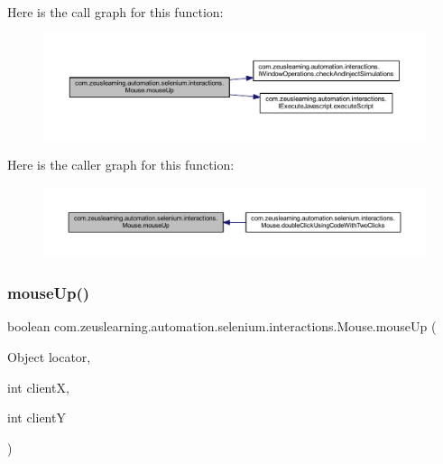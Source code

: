 Here is the call graph for this function\+:
\nopagebreak
\begin{figure}[H]
\begin{center}
\leavevmode
\includegraphics[width=350pt]{d0/dfa/classcom_1_1zeuslearning_1_1automation_1_1selenium_1_1interactions_1_1Mouse_a0b7f2ca5dafa810dc0a0ec1669f40fef_cgraph}
\end{center}
\end{figure}
Here is the caller graph for this function\+:
\nopagebreak
\begin{figure}[H]
\begin{center}
\leavevmode
\includegraphics[width=350pt]{d0/dfa/classcom_1_1zeuslearning_1_1automation_1_1selenium_1_1interactions_1_1Mouse_a0b7f2ca5dafa810dc0a0ec1669f40fef_icgraph}
\end{center}
\end{figure}
\hypertarget{classcom_1_1zeuslearning_1_1automation_1_1selenium_1_1interactions_1_1Mouse_a698245231ac2a9ab0080d6390e8a4b95}{}\label{classcom_1_1zeuslearning_1_1automation_1_1selenium_1_1interactions_1_1Mouse_a698245231ac2a9ab0080d6390e8a4b95} 
\subsubsection{\texorpdfstring{mouse\+Up()}{mouseUp()}\hspace{0.1cm}{\footnotesize\ttfamily [2/2]}}
{\footnotesize\ttfamily boolean com.\+zeuslearning.\+automation.\+selenium.\+interactions.\+Mouse.\+mouse\+Up (\begin{DoxyParamCaption}\item[{Object}]{locator,  }\item[{int}]{clientX,  }\item[{int}]{clientY }\end{DoxyParamCaption})\hspace{0.3cm}{\ttfamily [inline]}}


